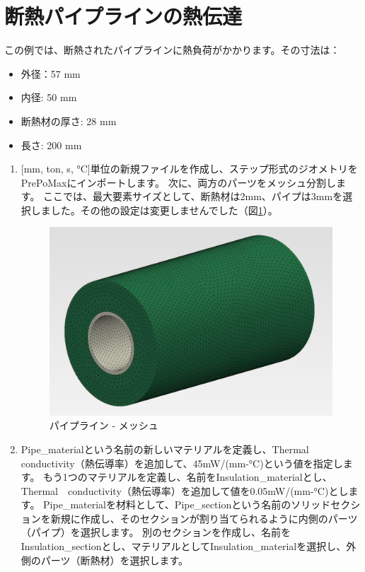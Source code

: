 \section{断熱パイプラインの熱伝達}
この例では、断熱されたパイプラインに熱負荷がかかります。その寸法は：
\begin{itemize}
\item 外径：57 mm
\item 内径: 50 mm
\item 断熱材の厚さ: 28 mm
\item 長さ: 200 mm
\end{itemize}
\begin{enumerate}
\item
  {[}mm, ton, s, °C{]}単位の新規ファイルを作成し、ステップ形式のジオメトリをPrePoMaxにインポートします。
  次に、両方のパーツをメッシュ分割します。
  ここでは、最大要素サイズとして、断熱材は2mm、パイプは3mmを選択しました。その他の設定は変更しませんでした（図\ref{fig:11-01}）。
	\begin{figure}[H]
	\centering
	\includegraphics[width=125mm]{fig/11-01.png}
	\caption{パイプライン - メッシュ}
	\label{fig:11-01}
	\end{figure}
	\vspace{-\baselineskip}
\item
  Pipe\_materialという名前の新しいマテリアルを定義し、Thermal　conductivity（熱伝導率）を追加して、45mW/(mm-°C)という値を指定します。
  もう1つのマテリアルを定義し、名前をInsulation\_materialとし、Thermal　conductivity（熱伝導率）を追加して値を0.05mW/(mm-°C)とします。
  Pipe\_materialを材料として、Pipe\_sectionという名前のソリッドセクションを新規に作成し、そのセクションが割り当てられるように内側のパーツ（パイプ）を選択します。
  別のセクションを作成し、名前をInsulation\_sectionとし、マテリアルとしてInsulation\_materialを選択し、外側のパーツ（断熱材）を選択します。

\end{enumerate}
